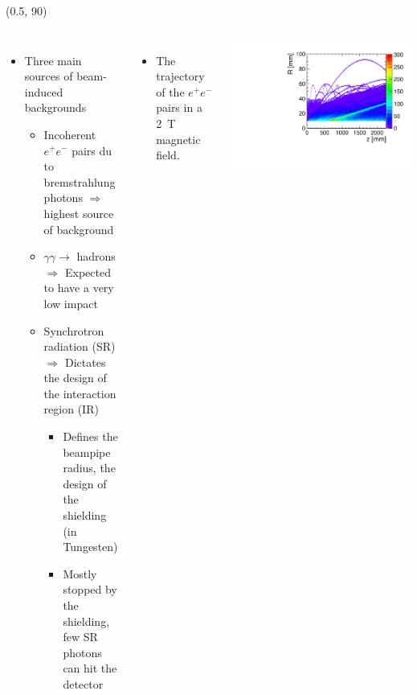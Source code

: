 \documentclass[final,xcolor={dvipsnames,svgnames,x11names,table}]{beamer}
\begin{document}
\begin{frame}
\begin{textblock}{82}
\begin{tcolorbox}[title=The drift chamber]
\begin{columns}
  \end{columns}

  \end{tcolorbox}
\end{textblock}


\begin{textblock}{80}(0.5, 90)
  \begin{tcolorbox}[title=Main sources of beam-induced backgrounds at the FCC-ee and the impact on the IDEA drift chamber]

  \begin{columns}
    \begin{itemize}
      \item Three main sources of beam-induced backgrounds
      \begin{itemize}
        \item Incoherent $e^+e^-$ pairs du to bremstrahlung photons $\Rightarrow$ highest source of background
        \item $\gamma\gamma\rightarrow$ hadrons $\Rightarrow$ Expected to have a very low impact
        \item Synchrotron radiation (SR) $\Rightarrow$ Dictates the design of the interaction region (IR)
          \begin{itemize}
            \item Defines the beampipe radius, the design of the shielding (in Tungesten)
            \item Mostly stopped by the shielding, few SR photons can hit the detector
          \end{itemize}
      \end{itemize}
    \end{itemize}

    \begin{itemize}
      \item The trajectory of the $e^+e^−$ pairs in a 2~T magnetic field.
    \end{itemize}
    \centering
    \includegraphics[width=\textwidth]{../figures/pairs_R_Z}


\end{columns}
\end{tcolorbox}
\end{textblock}
\end{frame}
\end{document}
